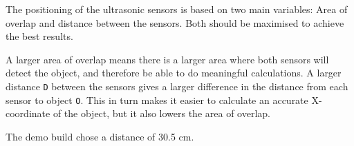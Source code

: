 The positioning of the ultrasonic sensors is based on two main variables: Area of overlap and distance between the sensors. Both should be maximised to achieve the best results.

A larger area of overlap means there is a larger area where both sensors will detect the object, and therefore be able to do meaningful calculations. A larger distance \texttt{D} between the sensors gives a larger difference in the distance from each sensor to object \texttt{O}. This in turn makes it easier to calculate an accurate X-coordinate of the object, but it also lowers the area of overlap.

The demo build chose a distance of 30.5 cm.
